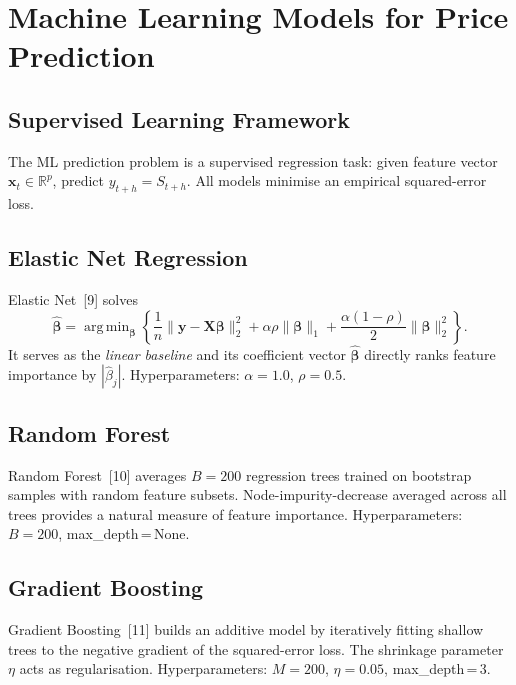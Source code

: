 \documentclass[12pt, a4paper, oneside]{report}
\theoremstyle{plain}
\theoremstyle{definition}
\theoremstyle{remark}
\newcommand{\R}{\mathbb{R}}
\DeclareMathOperator*{\argmin}{arg\,min}
\begin{document}
\chapter{Machine Learning Models for Price Prediction}
\label{ch:ml_models}

\section{Supervised Learning Framework}

The ML prediction problem is a supervised regression task: given feature
vector $\mathbf{x}_t \in \R^p$, predict $y_{t+h} = S_{t+h}$.  All models
minimise an empirical squared-error loss.

\section{Elastic Net Regression}

Elastic Net~[9] solves
\begin{equation}
\label{eq:enet}
  \hat{\bm\beta} = \argmin_{\bm\beta}
  \left\{
    \frac{1}{n}\|\mathbf{y} - \mathbf{X}\bm\beta\|_2^2
    + \alpha\rho\|\bm\beta\|_1
    + \frac{\alpha(1-\rho)}{2}\|\bm\beta\|_2^2
  \right\}.
\end{equation}
It serves as the \emph{linear baseline} and its coefficient vector $\hat{\bm\beta}$
directly ranks feature importance by $|\hat\beta_j|$.  Hyperparameters:
$\alpha = 1.0$, $\rho = 0.5$.

\section{Random Forest}

Random Forest~[10] averages $B = 200$ regression trees trained on bootstrap
samples with random feature subsets.  Node-impurity-decrease averaged across
all trees provides a natural measure of feature importance.
Hyperparameters: $B = 200$, max\_depth\,=\,None.

\section{Gradient Boosting}

Gradient Boosting~[11] builds an additive model by iteratively fitting shallow
trees to the negative gradient of the squared-error loss.  The shrinkage
parameter $\eta$ acts as regularisation.
Hyperparameters: $M = 200$, $\eta = 0.05$, max\_depth\,=\,3.
\end{document}
